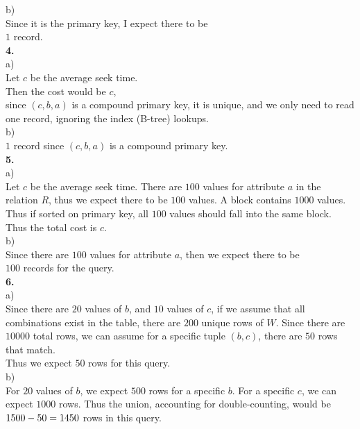 \documentclass[12pt, letterpaper, fleqn]{article}
\begin{document}
  b) \\
  Since it is the primary key, I expect there to be\\
  $1$ record. \\

  \textbf{4.} \\
  a) \\
  Let $c$ be the average seek time. \\
  Then the cost would be $c$,\\
  since $(c,b,a)$ is
  a compound primary key, it is unique, and we only need to read one record,
  ignoring the index (B-tree) lookups. \\

  b) \\
  $1$ record since $(c,b,a)$ is a compound primary key.\\

  \textbf{5.} \\
  a) \\
  Let $c$ be the average seek time. There are $100$ values for attribute $a$ in
  the relation $R$, thus we expect there to be $100$ values. A block contains
  $1000$ values. Thus if sorted on primary key, all $100$ values should fall
  into the same block. \\ 
  Thus the total cost is $c$.\\

  b) \\
  Since there are $100$ values for attribute $a$, then we expect there to be
  \\
  $100$ records for the query.\\

  \textbf{6.} \\
  a) \\
  Since there are $20$ values of $b$, and $10$ values of $c$, if we assume that
  all combinations exist in the table, there are $200$ unique rows of $W$. Since
  there are $10000$ total rows, we can assume for a specific tuple $(b,c)$,
  there are $50$ rows that match. \\
  Thus we expect $50$ rows for this query.\\

  b) \\
  For $20$ values of $b$, we expect $500$ rows for a specific $b$. For a
  specific $c$, we can expect $1000$ rows.
  Thus the union, accounting for
  double-counting, would be $1500 - 50 =\\
  1450$ rows in this query. \\
\end{document}
